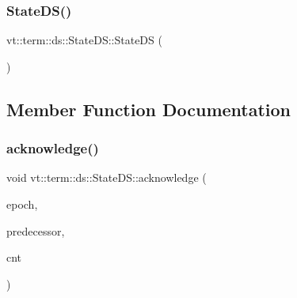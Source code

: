 \mbox{\label{structvt_1_1term_1_1ds_1_1_state_d_s_a83663b5cf3c5cc43eaa8bb0bd5edee31}} 
\subsubsection{\texorpdfstring{State\+D\+S()}{StateDS()}\hspace{0.1cm}{\footnotesize\ttfamily [3/3]}}
{\footnotesize\ttfamily vt\+::term\+::ds\+::\+State\+D\+S\+::\+State\+DS (\begin{DoxyParamCaption}\item[{\hyperlink{structvt_1_1term_1_1ds_1_1_state_d_s}{State\+DS} const \&}]{ }\end{DoxyParamCaption})\hspace{0.3cm}{\ttfamily [delete]}}



\subsection{Member Function Documentation}
\mbox{\label{structvt_1_1term_1_1ds_1_1_state_d_s_a60aafca7a5eef1368e55c02508a0f3bf}} 
\subsubsection{\texorpdfstring{acknowledge()}{acknowledge()}}
{\footnotesize\ttfamily void vt\+::term\+::ds\+::\+State\+D\+S\+::acknowledge (\begin{DoxyParamCaption}\item[{\hyperlink{namespacevt_a985a5adf291c34a3ca263b3378388236}{Epoch\+Type}}]{epoch,  }\item[{\hyperlink{structvt_1_1term_1_1ds_1_1_state_d_s_aba302de614dd639f5d93f4f5b6dd6108}{Endpoint}}]{predecessor,  }\item[{int64\+\_\+t}]{cnt }\end{DoxyParamCaption})\hspace{0.3cm}{\ttfamily [static]}}



